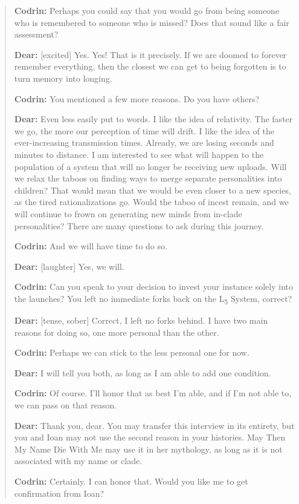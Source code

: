 \begin{quote}
\textbf{Codrin:} Perhaps you could say that you would go from being someone who is remembered to someone who is missed? Does that sound like a fair assessment?

\textbf{Dear:} {[}excited{]} Yes. Yes! That is it precisely. If we are doomed to forever remember everything, then the closest we can get to being forgotten is to turn memory into longing.

\textbf{Codrin:} You mentioned a few more reasons. Do you have others?

\textbf{Dear:} Even less easily put to words. I like the idea of relativity. The faster we go, the more our perception of time will drift. I like the idea of the ever-increasing transmission times. Already, we are losing seconds and minutes to distance. I am interested to see what will happen to the population of a system that will no longer be receiving new uploads. Will we relax the taboos on finding ways to merge separate personalities into children? That would mean that we would be even closer to a new species, as the tired rationalizations go. Would the taboo of incest remain, and we will continue to frown on generating new minds from in-clade personalities? There are many questions to ask during this journey.

\textbf{Codrin:} And we will have time to do so.

\textbf{Dear:} {[}laughter{]} Yes, we will.

\textbf{Codrin:} Can you speak to your decision to invest your instance solely into the launches? You left no immediate forks back on the L\textsubscript{5} System, correct?

\textbf{Dear:} {[}tense, sober{]} Correct, I left no forks behind. I have two main reasons for doing so, one more personal than the other.

\textbf{Codrin:} Perhaps we can stick to the less personal one for now.

\textbf{Dear:} I will tell you both, as long as I am able to add one condition.

\textbf{Codrin:} Of course. I'll honor that as best I'm able, and if I'm not able to, we can pass on that reason.

\textbf{Dear:} Thank you, dear. You may transfer this interview in its entirety, but you and Ioan may not use the second reason in your histories. May Then My Name Die With Me may use it in her mythology, as long as it is not associated with my name or clade.

\textbf{Codrin:} Certainly. I can honor that. Would you like me to get confirmation from Ioan?


\end{quote}
